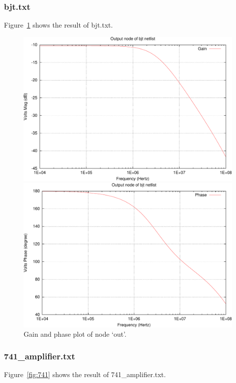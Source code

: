 \documentclass{article}
\begin{document}
\subsubsection{bjt.txt}
Figure~\ref{fig:bjt} shows the result of bjt.txt.

\begin{figure}[htbp]
  \centering
    \includegraphics[width=.8\textwidth]{bjt_out_g-crop.pdf}

    \vspace{2em}

    \includegraphics[width=.8\textwidth]{bjt_out_p-crop.pdf}
  \caption{Gain and phase plot of node `out'.}
  \label{fig:bjt}
\end{figure}


\subsubsection{741\_amplifier.txt}
Figure~\ref{fig:741} shows the result of 741\_amplifier.txt.
\end{document}

